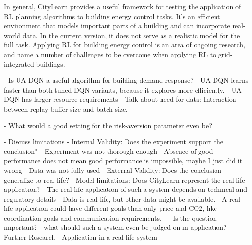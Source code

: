 

In general, CityLearn provides a useful framework for testing the application of RL planning algorithms to building energy control tasks.
It's an efficient environment that models important parts of a building and can incorporate real-world data.
In the current version, it does not serve as a realistic model for the full task.
Applying RL for building energy control is an area of ongoing research, and \cite{nweye2022RealworldChallengesMultiagent} name a number of challenges to be overcome when applying RL to grid-integrated buildings.


- Is UA-DQN a useful algorithm for building demand response?
  - UA-DQN learns faster than both tuned DQN variants, because it explores more efficiently.
  - UA-DQN has larger resource requirements
- Talk about need for data: Interaction between replay buffer size and batch size.

- What would a good setting for the risk-aversion parameter even be?



- Discuss limitations
- Internal Validity: Does the experiment support the conclusion?
  - Experiment was not thorough enough
  - Absence of good performance does not mean good performance is impossible, maybe I just did it wrong
  - Data was not fully used
- External Validity: Does the conclusion generalize to real life?
  - Model limitations: Does CityLearn represent the real life application?
    - The real life application of such a system depends on technical and regulatory details
    - Data is real life, but other data might be available.
    - A real life application could have different goals than only price and CO2, like coordination goals and communication requirements.
  - 
- Is the question important?
  - what should such a system even be judged on in application?
- Further Research
- Application in a real life system
- 
